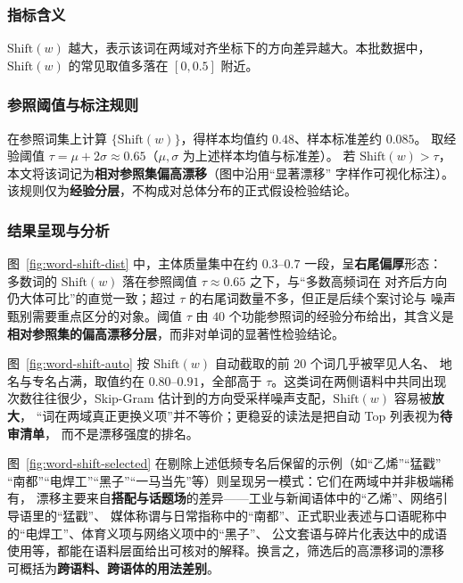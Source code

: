 \documentclass[withoutpreface]{cumcmthesis}
\begin{document}
\subsubsection{指标含义}
$\mathrm{Shift}(w)$ 越大，表示该词在两域对齐坐标下的方向差异越大。本批数据中，$\mathrm{Shift}(w)$ 的常见取值多落在 $[0,0.5]$ 附近。

\subsubsection{参照阈值与标注规则}

在参照词集上计算 $\{\mathrm{Shift}(w)\}$，得样本均值约 $0.48$、样本标准差约 $0.085$。
取经验阈值 $\tau=\mu+2\sigma\approx0.65$（$\mu,\sigma$ 为上述样本均值与标准差）。
若 $\mathrm{Shift}(w)>\tau$，本文将该词记为\textbf{相对参照集偏高漂移}（图中沿用“显著漂移”
字样作可视化标注）。该规则仅为\textbf{经验分层}，不构成对总体分布的正式假设检验结论。

\subsubsection{结果呈现与分析}

图~\ref{fig:word-shift-dist} 中，主体质量集中在约 $0.3$--$0.7$ 一段，呈\textbf{右尾偏厚}形态：
多数词的 $\mathrm{Shift}(w)$ 落在参照阈值 $\tau\approx0.65$ 之下，与“多数高频词在
对齐后方向仍大体可比”的直觉一致；超过 $\tau$ 的右尾词数量不多，但正是后续个案讨论与
噪声甄别需要重点区分的对象。阈值 $\tau$ 由 $40$ 个功能参照词的经验分布给出，其含义是
\textbf{相对参照集的偏高漂移分层}，而非对单词的显著性检验结论。

图~\ref{fig:word-shift-auto} 按 $\mathrm{Shift}(w)$ 自动截取的前 $20$ 个词几乎被罕见人名、
地名与专名占满，取值约在 $0.80$--$0.91$，全部高于 $\tau$。这类词在两侧语料中共同出现
次数往往很少，Skip-Gram 估计到的方向受采样噪声支配，$\mathrm{Shift}(w)$ 容易被\textbf{放大}，
“词在两域真正更换义项”并不等价；更稳妥的读法是把自动 Top 列表视为\textbf{待审清单}，
而不是漂移强度的排名。

图~\ref{fig:word-shift-selected} 在剔除上述低频专名后保留的示例（如“乙烯”“猛戳”
“南都”“电焊工”“黑子”“一马当先”等）则呈现另一模式：它们在两域中并非极端稀有，
漂移主要来自\textbf{搭配与话题场}的差异——工业与新闻语体中的“乙烯”、网络引导语里的“猛戳”、
媒体称谓与日常指称中的“南都”、正式职业表述与口语昵称中的“电焊工”、体育义项与网络义项中的“黑子”、
公文套语与碎片化表达中的成语使用等，都能在语料层面给出可核对的解释。换言之，筛选后的高漂移词的漂移
可概括为\textbf{跨语料、跨语体的用法差别}。
\end{document}
